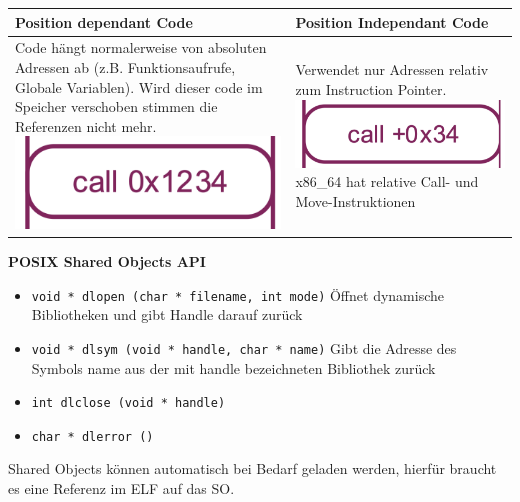 \documentclass[8pt]{extarticle}
\let\oldtextbf\textbf
\renewcommand{\textbf}{\tiny\oldtextbf}
\begin{document}
\begin{multicols*}{5}
	\begin{tabular}{|p{2.2cm}|p{2.2cm}|}
		\hline
		Position dependant Code                                                                                                                                                                                                              & Position Independant Code                                                                                                                                             \\
		\hline
		Code hängt normalerweise von absoluten Adressen ab (z.B. Funktionsaufrufe, Globale Variablen). Wird dieser code im Speicher verschoben stimmen die Referenzen nicht mehr. \includegraphics[scale=0.15]{Call_Position_dependant.png} & Verwendet nur Adressen relativ zum Instruction Pointer. \includegraphics[scale=0.15]{Call_Position_independant.png} x86\_64 hat relative Call- und Move-Instruktionen \\
		\hline
	\end{tabular}
	\textbf{POSIX Shared Objects API}
	\begin{itemize} [noitemsep, topsep=0pt, leftmargin=*]
		\item \texttt{void * dlopen (char * filename, int mode)} Öffnet dynamische Bibliotheken und gibt Handle darauf zurück
		\item \texttt{void * dlsym (void * handle, char * name)} Gibt die Adresse des Symbols name aus der mit handle bezeichneten Bibliothek zurück
		\item \texttt{int dlclose (void * handle)}
		\item \texttt{char * dlerror ()}
	\end{itemize}
	Shared Objects können automatisch bei Bedarf geladen werden, hierfür braucht es eine Referenz im ELF auf das SO.
			

\end{multicols*}
\end{document}
